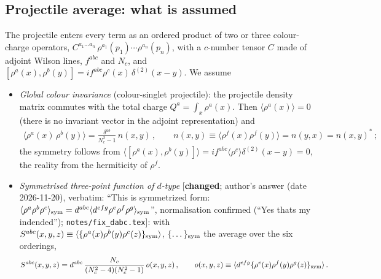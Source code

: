 \documentclass[9pt]{article}
\numberwithin{equation}{section}
\begin{document}
{\subsection{Projectile average: what is assumed}
\noindent The projectile enters every term as an ordered product of two or three colour-charge operators, $C^{a_{1}\dots a_{n}}\,\rho^{a_{1}}(p_{1})\cdots\rho^{a_{n}}(p_{n})$, with a $c$-number tensor $C$ made of adjoint Wilson lines, $f^{abc}$ and $N_{c}$, and $[\rho^{a}(x),\rho^{b}(y)]=if^{abc}\rho^{c}(x)\,\delta^{(2)}(x-y)$. We assume
\begin{itemize}
\item[(A1)] \emph{Global colour invariance} (colour-singlet projectile): the projectile density matrix commutes with the total charge $Q^{a}=\int_{x}\rho^{a}(x)$. Then $\langle\rho^{a}(x)\rangle=0$ (there is no invariant vector in the adjoint representation) and
\begin{align}
\langle\rho^{a}(x)\,\rho^{b}(y)\rangle=\frac{\delta^{ab}}{N_{c}^{2}-1}\,n(x,y)\,,\qquad n(x,y)\equiv\langle\rho^{f}(x)\rho^{f}(y)\rangle=n(y,x)=n(x,y)^{*}\,;\label{eq:s-A1}
\end{align}
the symmetry follows from $\langle[\rho^{a}(x),\rho^{b}(y)]\rangle=if^{abc}\langle\rho^{c}\rangle\delta^{(2)}(x-y)=0$, the reality from the hermiticity of $\rho^{f}$.
\item[(A2)] \emph{Symmetrised three-point function of $d$-type} [\textbf{changed}; author's answer (date 2026-11-20), verbatim: ``This is symmetrized form: $\langle\rho^{a}\rho^{b}\rho^{c}\rangle_{\rm sym}=d^{abc}\langle d^{efg}\rho^{e}\rho^{f}\rho^{g}\rangle_{\rm sym}$'', normalisation confirmed (``Yes thats my indended''); \texttt{notes/fix\_dabc.tex}]: with $S^{abc}(x,y,z)\equiv\langle\{\rho^{a}(x)\rho^{b}(y)\rho^{c}(z)\}_{\rm sym}\rangle$, $\{\dots\}_{\rm sym}$ the average over the six orderings,
\begin{align}
S^{abc}(x,y,z)=d^{abc}\,\frac{N_{c}}{(N_{c}^{2}-4)(N_{c}^{2}-1)}\,o(x,y,z)\,,\qquad o(x,y,z)\equiv\langle d^{efg}\{\rho^{e}(x)\rho^{f}(y)\rho^{g}(z)\}_{\rm sym}\rangle\,.\label{eq:s-A2d}
\end{align}
\end{itemize}
}
\end{document}
